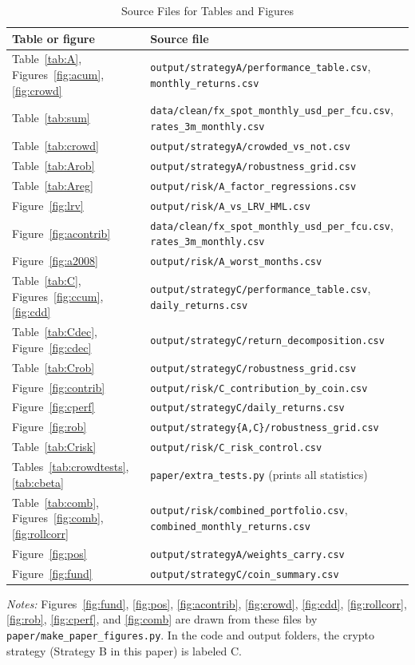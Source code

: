 \documentclass[11pt]{article}
\newcommand{\tabnote}[1]{\par\vspace{0.3em}\begin{minipage}{\linewidth}\footnotesize\setstretch{1.0}\textit{Notes:} #1\end{minipage}}
\begin{document}
\begin{table}[!htbp]
\centering
\caption{Source Files for Tables and Figures}\label{tab:files}
\small
\begin{tabular}{ll}
\toprule
Table or figure & Source file \\
\midrule
Table~\ref{tab:A}, Figures~\ref{fig:acum}, \ref{fig:crowd} & \texttt{output/strategyA/performance\_table.csv}, \texttt{monthly\_returns.csv} \\
Table~\ref{tab:sum} & \texttt{data/clean/fx\_spot\_monthly\_usd\_per\_fcu.csv}, \texttt{rates\_3m\_monthly.csv} \\
Table~\ref{tab:crowd} & \texttt{output/strategyA/crowded\_vs\_not.csv} \\
Table~\ref{tab:Arob} & \texttt{output/strategyA/robustness\_grid.csv} \\
Table~\ref{tab:Areg} & \texttt{output/risk/A\_factor\_regressions.csv} \\
Figure~\ref{fig:lrv} & \texttt{output/risk/A\_vs\_LRV\_HML.csv} \\
Figure~\ref{fig:acontrib} & \texttt{data/clean/fx\_spot\_monthly\_usd\_per\_fcu.csv}, \texttt{rates\_3m\_monthly.csv} \\
Figure~\ref{fig:a2008} & \texttt{output/risk/A\_worst\_months.csv} \\
Table~\ref{tab:C}, Figures~\ref{fig:ccum}, \ref{fig:cdd} & \texttt{output/strategyC/performance\_table.csv}, \texttt{daily\_returns.csv} \\
Table~\ref{tab:Cdec}, Figure~\ref{fig:cdec} & \texttt{output/strategyC/return\_decomposition.csv} \\
Table~\ref{tab:Crob} & \texttt{output/strategyC/robustness\_grid.csv} \\
Figure~\ref{fig:contrib} & \texttt{output/risk/C\_contribution\_by\_coin.csv} \\
Figure~\ref{fig:cperf} & \texttt{output/strategyC/daily\_returns.csv} \\
Figure~\ref{fig:rob} & \texttt{output/strategy\{A,C\}/robustness\_grid.csv} \\
Table~\ref{tab:Crisk} & \texttt{output/risk/C\_risk\_control.csv} \\
Tables~\ref{tab:crowdtests}, \ref{tab:cbeta} & \texttt{paper/extra\_tests.py} (prints all statistics) \\
Table~\ref{tab:comb}, Figures~\ref{fig:comb}, \ref{fig:rollcorr} & \texttt{output/risk/combined\_portfolio.csv}, \texttt{combined\_monthly\_returns.csv} \\
Figure~\ref{fig:pos} & \texttt{output/strategyA/weights\_carry.csv} \\
Figure~\ref{fig:fund} & \texttt{output/strategyC/coin\_summary.csv} \\
\bottomrule
\end{tabular}
\tabnote{Figures~\ref{fig:fund}, \ref{fig:pos}, \ref{fig:acontrib}, \ref{fig:crowd}, \ref{fig:cdd}, \ref{fig:rollcorr}, \ref{fig:rob}, \ref{fig:cperf}, and \ref{fig:comb} are drawn from these files by \texttt{paper/make\_paper\_figures.py}. In the code and output folders, the crypto strategy (Strategy B in this paper) is labeled C.}
\end{table}
\end{document}
